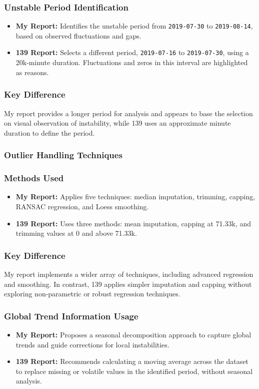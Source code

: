 \subsubsection*{Unstable Period Identification}
\begin{itemize}
    \item \textbf{My Report:} Identifies the unstable period from \texttt{2019-07-30} to \texttt{2019-08-14}, based on observed fluctuations and gaps.
    \item \textbf{139 Report:} Selects a different period, \texttt{2019-07-16} to \texttt{2019-07-30}, using a 20k-minute duration. Fluctuations and zeros in this interval are highlighted as reasons.
\end{itemize}

\subsubsection*{Key Difference}
My report provides a longer period for analysis and appears to base the selection on visual observation of instability, while 139 uses an approximate minute duration to define the period.

\subsubsection*{Outlier Handling Techniques}

\subsubsection*{Methods Used}
\begin{itemize}
    \item \textbf{My Report:} Applies five techniques: median imputation, trimming, capping, RANSAC regression, and Loess smoothing.
    \item \textbf{139 Report:} Uses three methods: mean imputation, capping at 71.33k, and trimming values at 0 and above 71.33k.
\end{itemize}

\subsubsection*{Key Difference}
My report implements a wider array of techniques, including advanced regression and smoothing. In contrast, 139 applies simpler imputation and capping without exploring non-parametric or robust regression techniques.

\subsubsection*{Global Trend Information Usage}
\begin{itemize}
    \item \textbf{My Report:} Proposes a seasonal decomposition approach to capture global trends and guide corrections for local instabilities.
    \item \textbf{139 Report:} Recommends calculating a moving average across the dataset to replace missing or volatile values in the identified period, without seasonal analysis.
\end{itemize}


